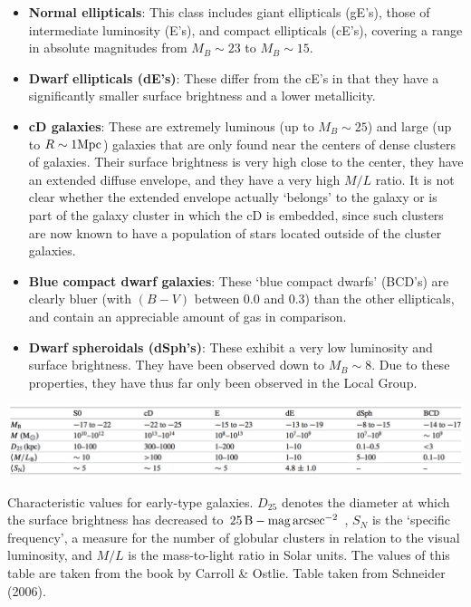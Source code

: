\documentclass[a4paper,10pt]{article}
\begin{document}
\begin{itemize}
    \item \textbf{Normal ellipticals}: This class includes giant ellipticals (gE's), those of intermediate luminosity (E's), and compact ellipticals (cE's), covering a range in absolute magnitudes from $M_B\sim23$ to $M_B\sim15$.
    \item \textbf{Dwarf ellipticals (dE's)}: These differ from the cE's in that they have a significantly smaller surface brightness and a lower metallicity.
    \item \textbf{cD galaxies}: These are extremely luminous (up to $M_B\sim25$) and large (up to $R\sim1{\rm Mpc}$) galaxies that are only found near the centers of dense clusters of galaxies. Their surface brightness is very high close to the center, they have an extended diffuse envelope, and they have a very high $M/L$ ratio. It is not clear whether the extended envelope actually `belongs' to the galaxy or is part of the galaxy cluster in which the cD is embedded, since such clusters are now known to have a population of stars located outside of the cluster galaxies.
    \item \textbf{Blue compact dwarf galaxies}: These `blue compact dwarfs' (BCD’s) are clearly bluer (with $(B-V)$ between $0.0$ and $0.3$) than the other ellipticals, and contain an appreciable amount of gas in comparison.
    \item \textbf{Dwarf spheroidals (dSph's)}: These exhibit a very low luminosity and surface brightness. They have been observed down to $M_B\sim8$. Due to these properties, they have thus far only been observed in the Local Group.
\end{itemize}

\begin{table}[t]
    \centering
    \includegraphics[width=16cm]{figures/EarlyGalaxies.png}
    \caption{\footnotesize{Characteristic values for early-type galaxies. $D_{25}$ denotes the diameter at which the surface brightness has decreased to $25\,{\rm B-mag\,arcsec^{-2}}$ , $S_N$ is the `specific frequency', a measure for the number of globular clusters in relation to the visual luminosity, and $M/L$ is the mass-to-light ratio in Solar units. The values of this table are taken from the book by Carroll \& Ostlie. Table taken from Schneider (2006).}}
    \label{table:earlygalaxies}
\end{table}
\end{document}
